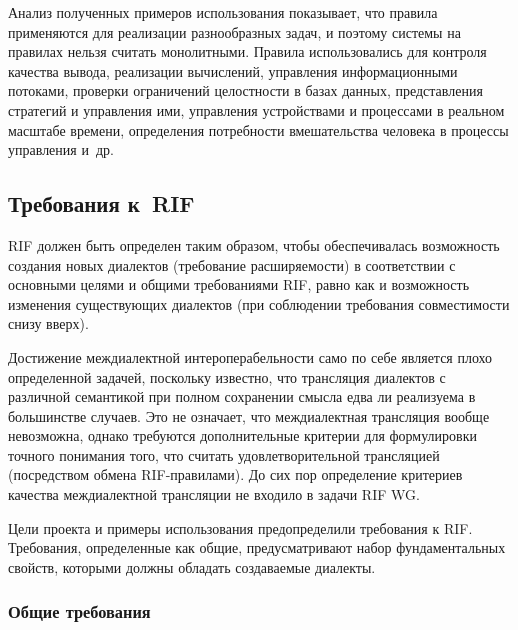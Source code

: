 \begin{multicols}{2}
Анализ полученных примеров использования показывает, что правила применяются для 
реализации разнообразных задач, и поэтому системы на правилах нельзя считать 
монолитными. Правила использовались для контроля качества вывода, реализации 
вычислений, управления информационными потоками, проверки ограничений целостности 
в базах данных, представления стратегий и управления ими, управления устройствами и 
процессами в реальном масштабе времени, определения потребности вмешательства 
человека в процессы управления и~др.

\vspace*{-4pt}
   
   \subsection{Требования к~RIF} %

RIF должен быть определен таким образом, чтобы обеспечивалась возможность создания 
новых диалектов (требование расширяемости) в соответствии с основными целями и общими 
требованиями RIF, равно как и возможность изменения существующих диалектов (при 
соблюдении требования совмес\-ти\-мости снизу вверх).

Достижение междиалектной интероперабельности само по себе является плохо 
определенной задачей, поскольку известно, что трансляция диалектов с различной 
семантикой при полном сохранении смысла едва ли реализуема в большинстве случаев. Это 
не означает, что междиалектная трансляция вообще невозможна, однако требуются 
дополнительные критерии для формулировки точного понимания того, что считать 
удовлетворительной трансляцией (посредством обмена RIF-пра\-ви\-ла\-ми). До сих пор 
определение критериев качества междиалектной трансляции не входило в задачи RIF WG. 

Цели проекта и примеры использования пред\-опре\-де\-ли\-ли требования к RIF. Требования, 
определенные как общие, предусматривают набор фундаментальных свойств, которыми 
должны обладать создаваемые диалекты.

\vspace*{-9pt}
   
   \subsubsection{Общие требования} %



\end{multicols}
